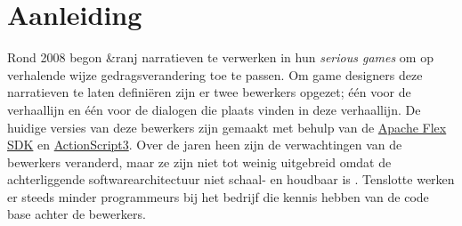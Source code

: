 \documentclass{report}
\newcommand{\organisation}{\&ranj}
\begin{document}
\section{Aanleiding} %

Rond 2008 begon \organisation{} narratieven te verwerken in hun \emph{serious games} om op verhalende wijze gedragsverandering toe te passen. Om game designers deze narratieven te laten defini{\"e}ren zijn er twee bewerkers opgezet; {\'e}{\'e}n voor de verhaallijn en {\'e}{\'e}n voor de dialogen die plaats vinden in deze verhaallijn. De huidige versies van deze bewerkers zijn gemaakt met behulp van de \href{https://en.wikipedia.org/wiki/Apache_Flex}{Apache Flex SDK} en \href{http://www.adobe.com/devnet/actionscript/articles/actionscript3_overview.html}{ActionScript3}.
Over de jaren heen zijn de verwachtingen van de bewerkers veranderd, maar ze zijn niet tot weinig uitgebreid omdat de achterliggende softwarearchitectuur niet schaal- en houdbaar is \cite{interviewivo}. Tenslotte werken er steeds minder programmeurs bij het bedrijf die kennis hebben van de code base achter de bewerkers.
\end{document}

